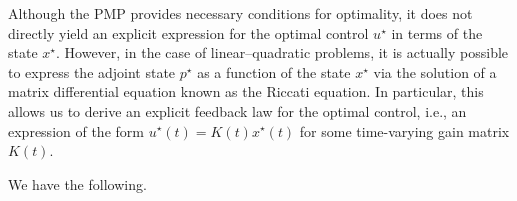 Although the PMP provides necessary conditions for optimality, it does not directly yield an explicit expression for the optimal control $u^\star$ in terms of the state $x^\star$.
However, in the case of linear–quadratic problems, it is actually possible to express the adjoint state $p^\star$ as a function of the state $x^\star$ via the solution of a matrix differential equation known as the Riccati equation. 
In particular, this allows us to derive an explicit feedback law for the optimal control, i.e., an expression of the form $u^\star(t) = K(t) x^\star(t)$ for some time-varying gain matrix $K(t)$.



We have the following.


